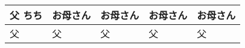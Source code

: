 \documentclass[a4j]{utreport}
\def\cell(#1,#2){#1 \newline \hspace*{2cm} #2}
\begin{document}
\newcommand\T{\rule{0pt}{2.6ex}} 


\begin{tabular}{|p{4cm} | p{4cm} | p{4cm} |  p{4cm} |  p{4cm} |}
\hline 
 \cell(父,ちち) & お母さん & お母さん & お母さん & お母さん \tabularnewline \hline  
 父 & 父 & 父 & 父 & 父 \tabularnewline \hline  
\end{tabular} 
\end{document}
